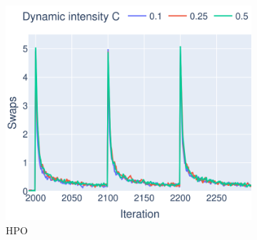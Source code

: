 \begin{figure}[H]
	\centering
	\begin{subfigure}{0.515\textwidth}
		\centering
		\includegraphics[width=\textwidth]{results/part3/run_plot_cmp_dynamic_aggr_None_y_swaps_1_to_30_HPO.svg}
		\caption{HPO}
		\label{fig:run_plot_cmp_dynamic_swaps_HPO}
	\end{subfigure}
	\begin{subfigure}{0.472\textwidth}
		\centering

\end{subfigure}
\end{figure}
